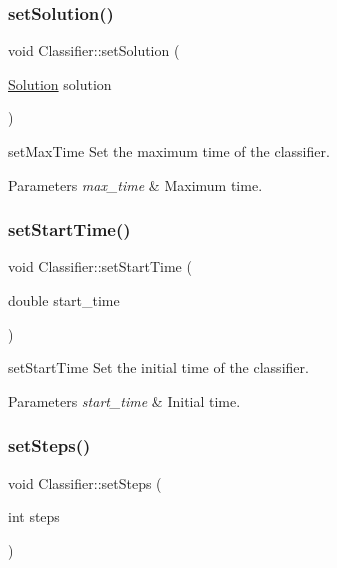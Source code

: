 \subsubsection{\texorpdfstring{set\+Solution()}{setSolution()}}
{\footnotesize\ttfamily void Classifier\+::set\+Solution (\begin{DoxyParamCaption}\item[{\hyperlink{class_solution}{Solution}}]{solution }\end{DoxyParamCaption})}



set\+Max\+Time Set the maximum time of the classifier. 


\begin{DoxyParams}{Parameters}
{\em max\+\_\+time} & Maximum time. \\
\hline
\end{DoxyParams}
\mbox{\label{class_classifier_a7f1cf3ac53b0593307a050368a912bb4}} 
\subsubsection{\texorpdfstring{set\+Start\+Time()}{setStartTime()}}
{\footnotesize\ttfamily void Classifier\+::set\+Start\+Time (\begin{DoxyParamCaption}\item[{double}]{start\+\_\+time }\end{DoxyParamCaption})}



set\+Start\+Time Set the initial time of the classifier. 


\begin{DoxyParams}{Parameters}
{\em start\+\_\+time} & Initial time. \\
\hline
\end{DoxyParams}
\mbox{\label{class_classifier_a779b6cac0351e272ee0573d919d5d060}} 
\subsubsection{\texorpdfstring{set\+Steps()}{setSteps()}}
{\footnotesize\ttfamily void Classifier\+::set\+Steps (\begin{DoxyParamCaption}\item[{int}]{steps }\end{DoxyParamCaption})\hspace{0.3cm}{\ttfamily [inline]}}



